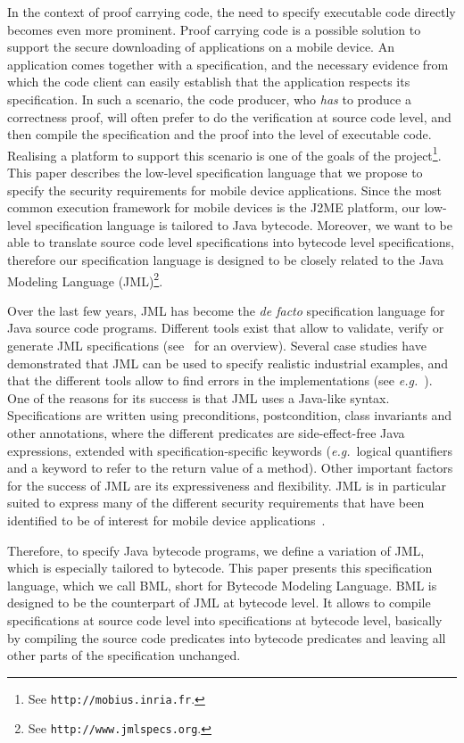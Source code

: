 In the context of proof carrying code, the need to specify executable
code directly becomes even more prominent. Proof carrying code is a
possible solution to support the secure downloading of applications on
a mobile device. An application comes together with a specification,
and the necessary evidence from which the code client can easily
establish that the application respects its specification. In such a
scenario, the code producer, who \emph{has} to produce a correctness
proof, will often prefer to do the verification at source code level,
and then compile the specification and the proof into the level of
executable code. Realising a platform to support this scenario is one
of the goals of the \mobius project\footnote{See
\texttt{http://mobius.inria.fr}.}. This paper describes the
low-level specification language that we propose to specify the
security requirements for mobile device applications. Since the most
common execution framework for mobile devices is the J2ME platform,
our low-level specification language is tailored to Java
bytecode. Moreover, we want to be able to translate source code level
specifications into bytecode level specifications, therefore our
specification language is designed to be closely related to the Java
Modeling Language (JML)\footnote{See
\texttt{http://www.jmlspecs.org}.}.


Over the last few years, JML has become the \emph{de facto}
specification language for Java source code programs. Different tools
exist that allow to validate, verify or generate JML specifications
(see~\cite{BurdyCCEKLLP05} for an overview). Several case studies have
demonstrated that JML can be used to specify realistic industrial
examples, and that the different tools allow to find errors in the
implementations (see \emph{e.g.}~\cite{BreunesseCHJ04}). One of the reasons
for its success is that JML uses a Java-like syntax. Specifications
are written using preconditions, postcondition, class invariants and
other annotations, where the different predicates are side-effect-free
Java expressions, extended with specification-specific keywords
(\emph{e.g.}\ logical quantifiers and a keyword to refer to the return value
of a method). Other important factors for the success of JML are its
expressiveness and flexibility. JML is in particular suited to express
many of the different security requirements that have been identified
to be of interest for mobile device
applications~\cite{Deliverable1.2}.


Therefore, to specify Java bytecode programs, we define a variation
of JML, which is especially tailored to bytecode. This paper
presents this specification language, which we call BML, short for
Bytecode Modeling Language. BML is designed to be the counterpart of
JML at bytecode level. It allows to compile specifications at source
code level into specifications at bytecode level, basically by
compiling the source code predicates into bytecode predicates and
leaving all other parts of the specification unchanged.


